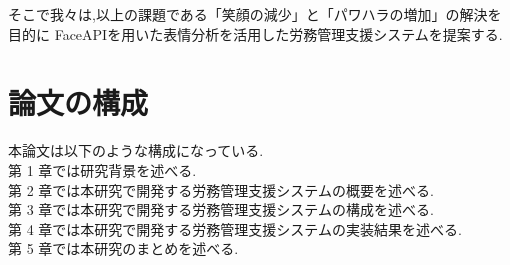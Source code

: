 そこで我々は,以上の課題である「笑顔の減少」と「パワハラの増加」の解決を目的に
FaceAPIを用いた表情分析を活用した労務管理支援システムを提案する.

\vspace{8mm}

\section{論文の構成}
本論文は以下のような構成になっている.
\\
第 1 章では研究背景を述べる.
\\
第 2 章では本研究で開発する労務管理支援システムの概要を述べる.
\\
第 3 章では本研究で開発する労務管理支援システムの構成を述べる.
\\
第 4 章では本研究で開発する労務管理支援システムの実装結果を述べる.
\\
第 5 章では本研究のまとめを述べる.